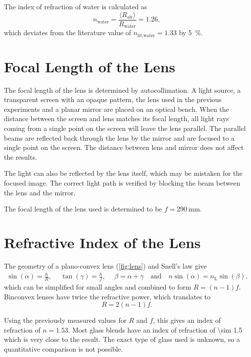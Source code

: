 The index of refraction of water is calculated as
\begin{equation*}
	n_\text{water} = \frac{\langle R_\text{air} \rangle}{R_\text{water}} = \num{1.26},
\end{equation*}
which deviates from the literature value of $n_\text{lit,water} = \num{1.33}$ by \SI{5}{\percent}.

\section{Focal Length of the Lens}

The focal length of the lens is determined by autocollimation.
A light source, a transparent screen with an opaque pattern, the lens used in the previous experiments and a planar mirror are placed on an optical bench.
When the distance between the screen and lens matches its focal length, all light rays coming from a single point on the screen will leave the lens parallel.
The parallel beams are reflected back through the lens by the mirror and are focused to a single point on the screen.
The distance between lens and mirror does not affect the results.

The light can also be reflected by the lens itself, which may be mistaken for the focused image.
The correct light path is verified by blocking the beam between the lens and the mirror.

The focal length of the lens used is determined to be $f = \SI{290}{\mm}$.

\section{Refractive Index of the Lens}
The geometry of a plano-convex lens (\autoref{fig:lens}) and Snell's law give
\begin{gather*}
	\sin(\alpha) = \frac{h}{R}, \quad\;
	\tan(\gamma) = \frac{h}{f}, \quad\;
	\beta = \alpha + \gamma \quad \text{and} \quad
	n \sin(\alpha) = n_\text{L} \sin(\beta),
\end{gather*}
which can be simplified for small angles and combined to form $R = \left(n - 1\right)f$.
Binconvex lenses have twice the refractive power, which translates to
\begin{equation*}
	R = 2 \left(n - 1\right)f.
\end{equation*}

Using the previously measured values for $R$ and $f$, this gives an index of refraction of $n = \num{1.53}$.
Most glass blends have an index of refraction of \num{\sim 1.5} which is very close to the result.
The exact type of glass used is unknown, so a quantitative comparison is not possible.

